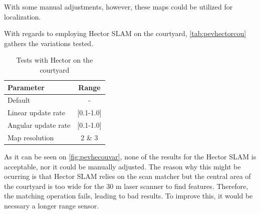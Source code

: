 With some manual adjustments, however, these maps could be utilized for localization.

 With regards to employing Hector SLAM on the courtyard, \autoref{tab:pevhectorcou} gathers the variations tested.
\begin{table}[h!]
  \centering
  \begin{tabular}{lc}
    \hline
    \textbf{Parameter} & \textbf{Range} \\ \hline
    Default & - \\ \hline
    Linear update rate & {[}0.1-1.0{]} \\ \hline
    Angular update rate & {[}0.1-1.0{]} \\ \hline
    Map resolution & 2 \& 3 \\ \hline
  \end{tabular}
  \caption{Tests with Hector on the courtyard}
  \label{tab:pevhectorcou}
\end{table}

As it can be seen on \autoref{fig:pevhecouvar}, none of the results for the Hector SLAM is acceptable, nor it could be manually adjusted. The reason why this might be ocurring is that Hector SLAM relies on the scan matcher but the central area of the courtyard is too wide for the 30 m laser scanner to find features. Therefore, the matching operation fails, leading to bad results. To improve this, it would be necssary a longer range sensor.

